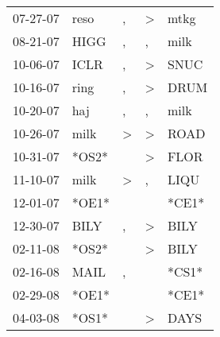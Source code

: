 \begin{supertabular}{p{0.07\textwidth}p{0.06\textwidth}p{0.02\textwidth}p{0.02\textwidth}p{0.06\textwidth}}
          07-27-07\textsuperscript{} &           reso\textsuperscript{} &                , &     \textgreater &           mtkg\textsuperscript{} \\
          08-21-07\textsuperscript{} &           HIGG\textsuperscript{} &                , &                , &           milk\textsuperscript{} \\
          10-06-07\textsuperscript{} &           ICLR\textsuperscript{} &                , &     \textgreater &           SNUC\textsuperscript{} \\
          10-16-07\textsuperscript{} &           ring\textsuperscript{} &                , &     \textgreater &           DRUM\textsuperscript{} \\
          10-20-07\textsuperscript{} &            haj\textsuperscript{} &                , &                , &           milk\textsuperscript{} \\
          10-26-07\textsuperscript{} &           milk\textsuperscript{} &     \textgreater &     \textgreater &           ROAD\textsuperscript{} \\
          10-31-07\textsuperscript{} &                            *OS2* &                  &     \textgreater &           FLOR\textsuperscript{} \\
          11-10-07\textsuperscript{} &           milk\textsuperscript{} &     \textgreater &                , &           LIQU\textsuperscript{} \\
          12-01-07\textsuperscript{} &                            *OE1* &                  &                  &                            *CE1* \\
          12-30-07\textsuperscript{} &           BILY\textsuperscript{} &                , &     \textgreater &           BILY\textsuperscript{} \\
          02-11-08\textsuperscript{} &                            *OS2* &                  &     \textgreater &           BILY\textsuperscript{} \\
          02-16-08\textsuperscript{} &           MAIL\textsuperscript{} &                , &                  &                            *CS1* \\
          02-29-08\textsuperscript{} &                            *OE1* &                  &                  &                            *CE1* \\
          04-03-08\textsuperscript{} &                            *OS1* &                  &     \textgreater &           DAYS\textsuperscript{} \\

\end{supertabular}
